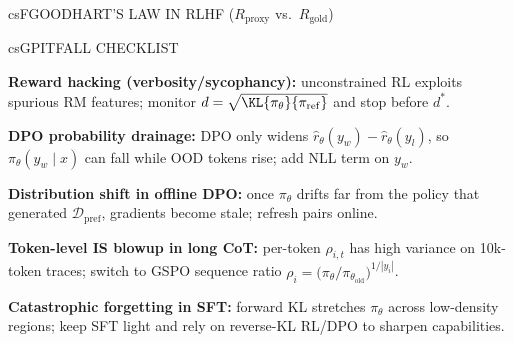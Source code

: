 \documentclass[../../../../master.tex]{subfiles}
\begin{document}
\begin{cscolumns}
\begin{cscard}{csF}{GOODHART'S LAW IN RLHF ($R_{\mathrm{proxy}}$ vs.\ $R_{\mathrm{gold}}$)}
  \centering
\end{cscard}
\columnbreak

\begin{cscard}{csG}{PITFALL CHECKLIST}
  \begin{csbul}
    \item \textbf{Reward hacking (verbosity/sycophancy):} unconstrained RL exploits spurious RM features; monitor $d=\sqrt{\KL{\pi_\theta}{\pi_{\mathrm{ref}}}}$ and stop before $d^*$.
    \item \textbf{DPO probability drainage:} DPO only widens $\hat{r}_\theta(y_w)-\hat{r}_\theta(y_l)$, so $\pi_\theta(y_w\mid x)$ can fall while OOD tokens rise; add NLL term on $y_w$.
    \item \textbf{Distribution shift in offline DPO:} once $\pi_\theta$ drifts far from the policy that generated $\mathcal{D}_{\mathrm{pref}}$, gradients become stale; refresh pairs online.
    \item \textbf{Token-level IS blowup in long CoT:} per-token $\rho_{i,t}$ has high variance on 10k-token traces; switch to GSPO sequence ratio $\rho_i=\big(\pi_\theta/\pi_{\theta_{\mathrm{old}}}\big)^{1/|y_i|}$.
    \item \textbf{Catastrophic forgetting in SFT:} forward KL stretches $\pi_\theta$ across low-density regions; keep SFT light and rely on reverse-KL RL/DPO to sharpen capabilities.
  \end{csbul}
\end{cscard}


\end{cscolumns}
\end{document}
